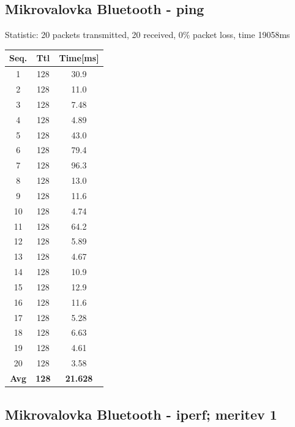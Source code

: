 \documentclass[11pt,a4paper,slovene]{article}
\begin{document}
\subsection{Mikrovalovka Bluetooth - ping}

Statistic: 20 packets transmitted, 20 received, 0\% packet loss, time 19058ms
 
\begin{table}[H]
	\begin{adjustwidth}{-3cm}{-3cm}
	\centering
		\begin{tabular}{c|c|c}
		\hline
		\textbf{Seq.} & \textbf{Ttl} & \textbf{Time[ms]}\\
     	\hline
     	1 & 128 & 30.9\\
  		2 & 128 & 11.0\\
  		3 & 128 & 7.48\\
  		4 & 128 & 4.89\\
  		5 & 128 & 43.0\\
  		6 & 128 & 79.4\\
  		7 & 128 & 96.3\\
  		8 & 128 & 13.0\\
  		9 & 128 & 11.6\\
  		10 & 128 & 4.74\\
  		11 & 128 & 64.2\\
  		12 & 128 & 5.89\\
  		13 & 128 & 4.67\\
  		14 & 128 & 10.9\\
  		15 & 128 & 12.9\\
  		16 & 128 & 11.6\\
  		17 & 128 & 5.28\\
  		18 & 128 & 6.63\\
  		19 & 128 & 4.61\\
  		20 & 128 & 3.58\\
  		\hline
  		\textbf{Avg} & \textbf{128} & \textbf{21.628}\\
  		\hline
  		\end{tabular}
    	\end{adjustwidth}
\end{table}

\subsection{Mikrovalovka Bluetooth - iperf; meritev 1}
\end{document}
